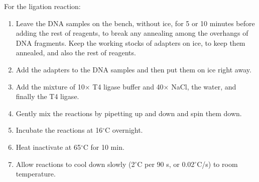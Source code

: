 \documentclass[a4paper,12pt,twosided]{article}
\begin{document}
For the ligation reaction:
\begin{enumerate}
  \item Leave the DNA samples on the bench, without ice, for 5 or 10 minutes before adding the rest of reagents, to break any annealing among the overhangs of DNA fragments. Keep the working stocks of adapters on ice, to keep them annealed, and also the rest of reagents.
  \item Add the adapters to the DNA samples and then put them on ice right away.
  \item Add the mixture of 10$\times$ T4 ligase buffer and 40$\times$ NaCl, the water, and finally the T4 ligase.
  \item Gently mix the reactions by pipetting up and down and spin them down.
  \item Incubate the reactions at 16$^\circ{}$C overnight.
  \item Heat inactivate at 65$^\circ$C for 10 min.
  \item Allow reactions to cool down slowly (2$^\circ{}$C per 90 s, or 0.02$^\circ$C/s) to room temperature.
\end{enumerate}
\end{document}
